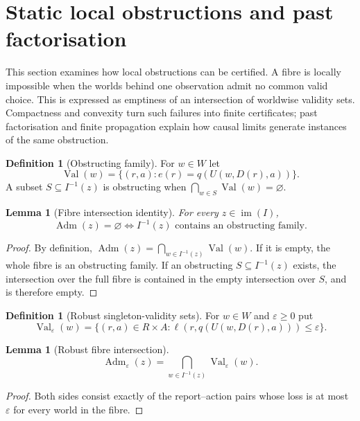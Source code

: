 \documentclass[11pt]{article}
\theoremstyle{plain}
\newtheorem{lemma}[theorem]{Lemma}
\theoremstyle{definition}
\newtheorem{definition}[theorem]{Definition}
\theoremstyle{remark}
\newcommand{\im}{\operatorname{im}}
\newcommand{\Adm}{\operatorname{Adm}}
\newcommand{\eps}{\varepsilon}
\begin{document}
\section{Static local obstructions and past factorisation}\label{sec:static-local}

This section examines how local obstructions can be certified. A fibre is
locally impossible when the worlds behind one observation admit no common valid
choice. This is expressed as emptiness of an intersection of worldwise validity
sets. Compactness and convexity turn such failures into finite certificates;
past factorisation and finite propagation explain how causal limits generate
instances of the same obstruction.



\begin{definition}[Obstructing family]\label{def:obfamily}
For $w\in W$ let
\[
\operatorname{Val}(w)=\{(r,a):e(r)=q(U(w,D(r),a))\}.
\]
A subset $S\subseteq I^{-1}(z)$ is obstructing when
$\bigcap_{w\in S}\operatorname{Val}(w)=\varnothing$.
\end{definition}

\begin{lemma}[Fibre intersection identity]\label{lem:Wfam}
For every $z\in\im(I)$,
\[
\Adm(z)=\varnothing
\iff
I^{-1}(z)\text{ contains an obstructing family}.
\]
\end{lemma}

\begin{proof}
By definition,
$\Adm(z)=\bigcap_{w\in I^{-1}(z)}\operatorname{Val}(w)$. If it is empty, the
whole fibre is an obstructing family. If an obstructing
$S\subseteq I^{-1}(z)$ exists, the intersection over the full fibre is contained
in the empty intersection over $S$, and is therefore empty.
\end{proof}

\begin{definition}[Robust singleton-validity sets]\label{def:valeps}
For $w\in W$ and $\eps\ge0$ put
\[
\operatorname{Val}_\eps(w)=
\{(r,a)\in R\times A:
\ell(r,q(U(w,D(r),a)))\le\eps\}.
\]
\end{definition}

\begin{lemma}[Robust fibre intersection]\label{lem:robust-intersection}
\[
\Adm_\eps(z)=
\bigcap_{w\in I^{-1}(z)}\operatorname{Val}_\eps(w).
\]
\end{lemma}

\begin{proof}
Both sides consist exactly of the report--action pairs whose loss is at most
$\eps$ for every world in the fibre.
\end{proof}
\end{document}
